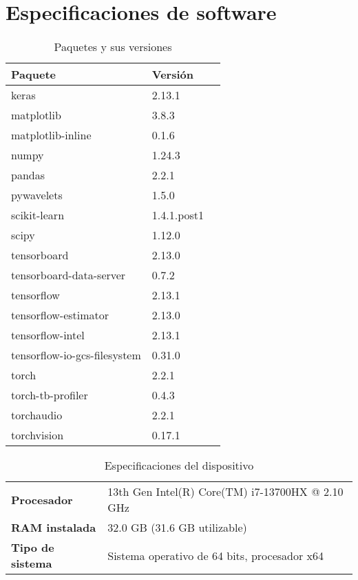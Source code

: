 \chapter{Especificaciones de software}
\label{ApC}

\begin{table}[htbp]
  \centering
  \caption{Paquetes y sus versiones}
  \begin{tabular}{lll}
    \toprule
    \textbf{Paquete} & \textbf{Versión} \\
    \midrule
    keras                        & 2.13.1 \\
    matplotlib                   & 3.8.3 \\
    matplotlib-inline            & 0.1.6 \\
    numpy                        & 1.24.3 \\
    pandas                       & 2.2.1 \\
    pywavelets                   & 1.5.0 \\
    scikit-learn                 & 1.4.1.post1 \\
    scipy                        & 1.12.0 \\
    tensorboard                  & 2.13.0 \\
    tensorboard-data-server      & 0.7.2 \\
    tensorflow                   & 2.13.1 \\
    tensorflow-estimator         & 2.13.0 \\
    tensorflow-intel             & 2.13.1 \\
    tensorflow-io-gcs-filesystem & 0.31.0 \\
    torch                        & 2.2.1 \\
    torch-tb-profiler            & 0.4.3 \\
    torchaudio                   & 2.2.1 \\
    torchvision                  & 0.17.1 \\
    \bottomrule
  \end{tabular}
\end{table}

\begin{table}[htbp]
  \centering
  \caption{Especificaciones del dispositivo}
  \begin{tabular}{ll}
    \toprule
    \textbf{Procesador} & 13th Gen Intel(R) Core(TM) i7-13700HX @ 2.10 GHz \\
    \textbf{RAM instalada} & 32.0 GB (31.6 GB utilizable) \\
    \textbf{Tipo de sistema} & Sistema operativo de 64 bits, procesador x64 \\
    \bottomrule
  \end{tabular}
\end{table}
